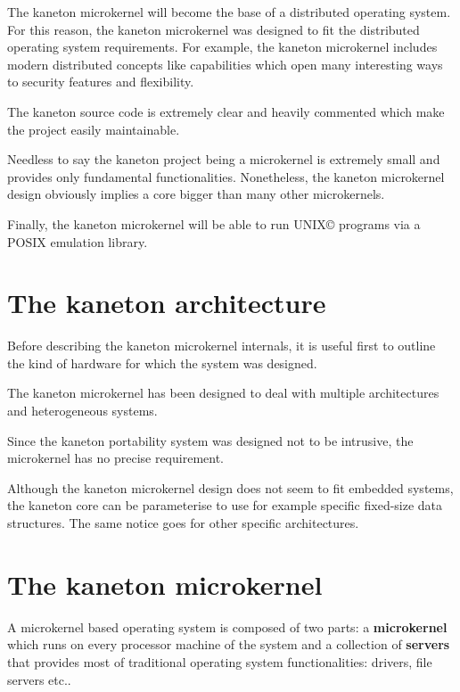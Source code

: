 \begin{multicols}{2}
The kaneton microkernel will become the base of a distributed operating
system. For this reason, the kaneton microkernel was designed to fit
the distributed operating system requirements. For example, the kaneton
microkernel includes modern distributed concepts like capabilities
which open many interesting ways to security features and flexibility.

The kaneton source code is extremely clear and heavily commented which
make the project easily maintainable.

Needless to say the kaneton project being a microkernel is extremely small
and provides only fundamental functionalities. Nonetheless, the kaneton
microkernel design obviously implies a core bigger than many other
microkernels.

Finally, the kaneton microkernel will be able to run
UNIX{\scriptsize \copyright} programs via a POSIX emulation library.

%
%

\section{The kaneton architecture}

Before describing the kaneton microkernel internals, it is useful first to
outline the kind of hardware for which the system was designed.

The kaneton microkernel has been designed to deal with multiple architectures
and heterogeneous systems.

Since the kaneton portability system was designed not to be intrusive, the
microkernel has no precise requirement.

Although the kaneton microkernel design does not seem to fit embedded
systems, the kaneton core can be parameterise to use for example specific
fixed-size data structures. The same notice goes for other specific
architectures.

%
%

\section{The kaneton microkernel}

A microkernel based operating system is composed of two parts:
a \textbf{microkernel} which runs on every processor machine of the system
and a collection of \textbf{servers} that provides most of traditional
operating system functionalities: drivers, file servers etc..


\end{multicols}
